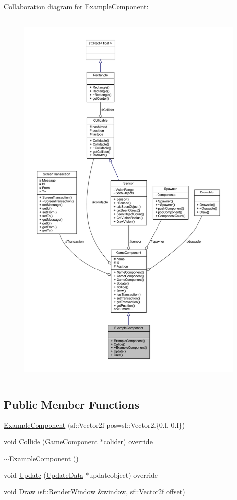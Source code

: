Collaboration diagram for Example\-Component\-:
\nopagebreak
\begin{figure}[H]
\begin{center}
\leavevmode
\includegraphics[height=550pt]{class_example_component__coll__graph}
\end{center}
\end{figure}
\subsection*{Public Member Functions}
\begin{DoxyCompactItemize}
\item 
\hyperlink{class_example_component_a09d97ad014e5ebe38220da6c80e96873}{Example\-Component} (sf\-::\-Vector2f pos=sf\-::\-Vector2f\{0.f, 0.f\})
\item 
void \hyperlink{class_example_component_a6ab733042d45aaa046201f486ece06b5}{Collide} (\hyperlink{class_game_component}{Game\-Component} $\ast$colider) override
\item 
\hyperlink{class_example_component_aa3a6265806020d1536d21272906181c6}{$\sim$\-Example\-Component} ()
\item 
void \hyperlink{class_example_component_a74028c9fbf9ec0fc523e60416433eacb}{Update} (\hyperlink{class_update_data}{Update\-Data} $\ast$updateobject) override
\item 
void \hyperlink{class_example_component_a385a5f04cdf04e91c8340632a1af9edc}{Draw} (sf\-::\-Render\-Window \&window, sf\-::\-Vector2f offset)
\end{DoxyCompactItemize}
